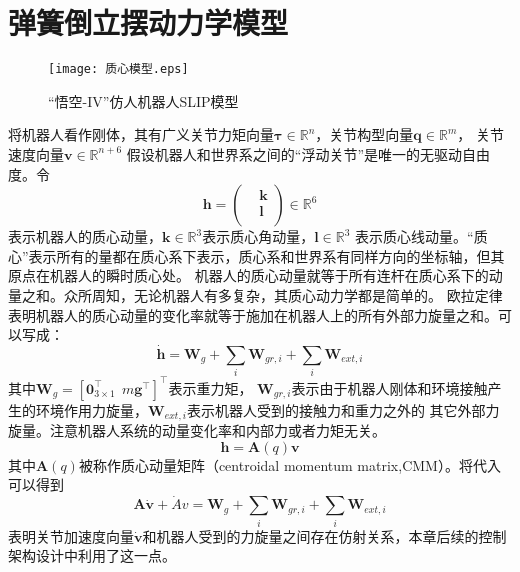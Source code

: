 \section{弹簧倒立摆动力学模型}
\label{sec:dynamics}
\begin{figure}[htbp]
    \centering
    \texttt{[image: 质心模型.eps]}
    \caption{\label{fig:com_model}“悟空-IV”仿人机器人SLIP模型}
\end{figure}
将机器人看作刚体，其有广义关节力矩向量$\boldsymbol{\tau} \in {{\mathbb{R}}^{n}}$，关节构型向量$\boldsymbol{q}\in {{\mathbb{R}}^{m}}$，
关节速度向量$\boldsymbol{v}\in {{\mathbb{R}}^{n+6}}$
假设机器人和世界系之间的“浮动关节”是唯一的无驱动自由度。令
\begin{equation}
    \label{equ:momentum}
    \boldsymbol{h}=\left(\begin{aligned}
        & \boldsymbol{k} \\ 
       & \boldsymbol{l} \\ 
      \end{aligned} \right)\in \mathbb{R}^{6}
\end{equation}
表示机器人的质心动量，$\boldsymbol{k}\in {{\mathbb{R}}^{3}}$表示质心角动量，$\boldsymbol{l}\in {{\mathbb{R}}^{3}}$
表示质心线动量。“质心”表示所有的量都在质心系下表示，质心系和世界系有同样方向的坐标轴，但其原点在机器人的瞬时质心处。
机器人的质心动量就等于所有连杆在质心系下的动量之和。众所周知，无论机器人有多复杂，其质心动力学都是简单的。
欧拉定律表明机器人的质心动量的变化率就等于施加在机器人上的所有外部力旋量之和。可以写成：
\begin{equation}
    \label{equ:euler's_law}
    \dot{\boldsymbol{h}}={{\boldsymbol{W}}_{g}}+\sum\limits_{i}{{{\boldsymbol{W}}_{gr,i}}}+\sum\limits_{i}{{{\boldsymbol{W}}_{ext,i}}}
\end{equation}
其中${{\boldsymbol{W}}_{g}}={{[\mathbf{0}_{3\times 1}^{\top }\ \ m{{\mathbf{g}}^{\top }}]}^{\top }}$表示重力矩，
${\boldsymbol{W}}_{gr,i}$表示由于机器人刚体和环境接触产生的环境作用力旋量，${\boldsymbol{W}}_{ext,i}$表示机器人受到的接触力和重力之外的
其它外部力旋量。注意机器人系统的动量变化率和内部力或者力矩无关。
\begin{equation}
    \label{equ:euler_linear_equ}
    \boldsymbol{h}=\boldsymbol{A}(q)\boldsymbol{v}
\end{equation}
其中$\boldsymbol{A}(q)$被称作质心动量矩阵（centroidal momentum matrix,CMM）。将代入可以得到
\begin{equation}
    \label{equ:euler_wrench}
    \boldsymbol{A}\dot{\boldsymbol{v}}+\dot{A}v={{\boldsymbol{W}}_{g}}+\sum\limits_{i}{{{\boldsymbol{W}}_{gr,i}}}
    +\sum\limits_{i}{{{\boldsymbol{W}}_{ext,i}}}
\end{equation}
表明关节加速度向量$\dot{\boldsymbol{v}}$和机器人受到的力旋量之间存在仿射关系，本章后续的控制架构设计中利用了这一点。
